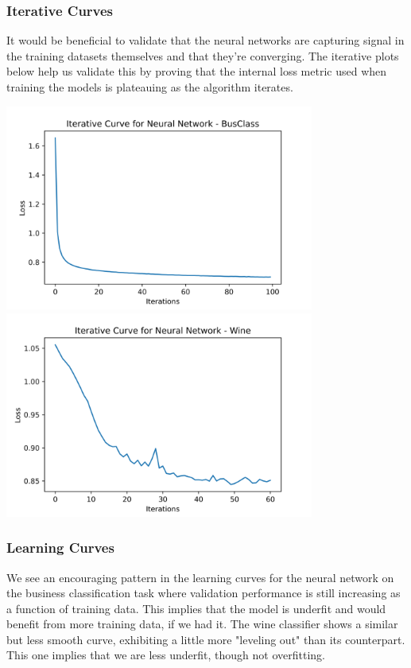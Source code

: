 \documentclass[
	letterpaper, %
]{jdf}
\begin{document}
\subsubsection{Iterative Curves}
It would be beneficial to validate that the neural networks are capturing signal in the training datasets themselves and that they're converging. The iterative plots below help us validate this by proving that the internal loss metric used when training the models is plateauing as the algorithm iterates.

\includegraphics[width=4in]{Figures/BusClass-0920/NN/bus_class_iterative_curve.png}
\includegraphics[width=4in]{Figures/Wine-0921/NN/wine_iterative_curve.png}

\subsubsection{Learning Curves}
We see an encouraging pattern in the learning curves for the neural network on the business classification task where validation performance is still increasing as a function of training data. This implies that the model is underfit and would benefit from more training data, if we had it. The wine classifier shows a similar but less smooth curve, exhibiting a little more "leveling out" than its counterpart. This one implies that we are less underfit, though not overfitting.
\end{document}
